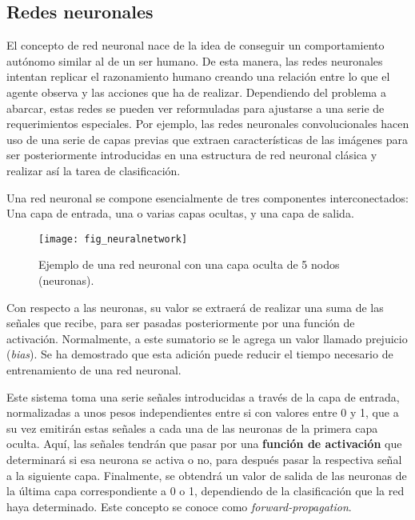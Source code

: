 \documentclass[11pt,spanish,listoffigures,listoftables]{tfgetsinf}
\begin{document}


\subsection{Redes neuronales}

El concepto de red neuronal nace de la idea de conseguir un comportamiento autónomo similar al de un ser humano. De esta manera, las redes neuronales intentan replicar el razonamiento humano creando una relación entre lo que el agente observa y las acciones que ha de realizar. Dependiendo del problema a abarcar, estas redes se pueden ver reformuladas para ajustarse a una serie de requerimientos especiales. Por ejemplo, las redes neuronales convolucionales hacen uso de una serie de capas previas que extraen características de las imágenes para ser posteriormente introducidas en una estructura de red neuronal clásica y realizar así la tarea de clasificación.

Una red neuronal se compone esencialmente de tres componentes interconectados: Una capa de entrada, una o varias capas ocultas, y una capa de salida.

\begin{figure}[h]
	\centering
	\texttt{[image: fig\_neuralnetwork]}
	\caption{Ejemplo de una red neuronal con una capa oculta de 5 nodos (neuronas).}
	
\end{figure}

Con respecto a las neuronas, su valor se extraerá de realizar una suma de las señales que recibe, para ser pasadas posteriormente por una función de activación. Normalmente, a este sumatorio se le agrega un valor llamado prejuicio (\textit{bias}). Se ha demostrado que esta adición puede reducir el tiempo necesario de entrenamiento de una red neuronal.

Este sistema toma una serie señales introducidas a través de la capa de entrada, normalizadas a unos pesos independientes entre si con valores entre 0 y 1, que a su vez emitirán estas señales a cada una de las neuronas de la primera capa oculta. Aquí, las señales tendrán que pasar por una \textbf{función de activación} que determinará si esa neurona se activa o no, para después pasar la respectiva señal a la siguiente capa. Finalmente, se obtendrá un valor de salida de las neuronas de la última capa correspondiente a 0 o 1, dependiendo de la clasificación que la red haya determinado. Este concepto se conoce como \textit{forward-propagation}.
\end{document}
